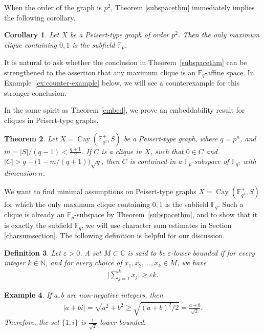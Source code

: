 \documentclass[12pt,reqno]{amsart}
\newtheorem{thm}{Theorem}[section]
\newtheorem{defn}[thm]{Definition}
\newtheorem{ex}[thm]{Example}
\newtheorem{cor}[thm]{Corollary}
\theoremstyle{definition}
\newcommand{\C}{\mathbb{C}}
\newcommand{\N}{\mathbb{N}}
\newcommand{\F}{\mathbb{F}}
\begin{document}
When the order of the graph is $p^2$, Theorem \ref{subspacethm} immediately implies the following corollary.

\begin{cor}
Let $X$ be a Peisert-type graph of order $p^2$. Then the only maximum clique containing $0,1$ is the subfield $\F_{p}$. 
\end{cor}

It is natural to ask whether the conclusion in Theorem~\ref{subspacethm} can be strengthened to the assertion that any maximum clique is an $\F_q$-affine space. In Example~\ref{ex:counter-example} below, we will see a counterexample for this stronger conclusion.

In the same spirit as Theorem \ref{embed}, we prove an embeddability result for cliques in Peisert-type graphs. 


\begin{thm} \label{stabilitythm}
Let $X=\operatorname{Cay}(\F_{q^2}^+, S)$ be a Peisert-type graph, where $q=p^n$, and $m=|S|/(q-1)<\frac{q+1}{2}$. If $C$ is a clique in $X$, such that $0 \in C$ and $|C|>q-\big(1-m/(q+1)\big)\sqrt{q}$, then $C$ is contained in a $\F_p$-subspace of $\F_{q^2}$ with dimension $n$. 
\end{thm}

We want to find minimal assumptions on Peisert-type graphs $X=\operatorname{Cay}(\F_{q^2}^+, S)$ for which the only maximum clique containing $0,1$ is the subfield $\F_q$. Such a clique is already an $\F_p$-subspace by Theorem~\ref{subspacethm}, and to show that it is exactly the subfield $\F_q$, we will use character sum estimates in Section \ref{charsumsection}. The following definition is helpful for our discussion.

\begin{defn}\label{defn:epsilon-bounded}
Let $\varepsilon>0$. A set $M \subset \C$ is said to be $\varepsilon$-lower bounded if for every integer $k \in \N$, and for every choice of $x_1,x_2,\ldots, x_k \in M$, we have
\begin{align*}
\bigg|\sum_{j=1}^{k} x_j\bigg| \geq \varepsilon k.
\end{align*}
\end{defn}

\begin{ex}\label{P*ex} \rm
If $a,b$ are non-negative integers, then 
\begin{align*}
|a+bi|=\sqrt{a^2+b^2} \geq \sqrt{(a+b)^2/2}=\frac{a+b}{\sqrt{2}}.
\end{align*}
Therefore, the set $\{1,i\}$ is $\frac{1}{\sqrt{2}}$-lower bounded. 
\end{ex}
\end{document}
